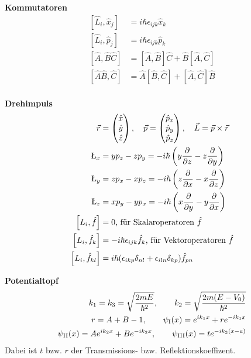 \documentclass[landscape,8pt]{scrartcl}
\newcommand{\myheading}[1]{\noindent\textbf{#1}\\}
\begin{document}
\begin{multicols}{3}
\myheading{Kommutatoren}
\begin{align*}
\left[\hat L_i,\hat x_j\right] &= i\hbar \epsilon_{ijk}\hat x_k	\\
\left[\hat L_i,\hat p_j\right] &= i\hbar \epsilon_{ijk}\hat p_k	\\
\left[\hat A, \hat B \hat C\right]&= \left[ \hat A, \hat B \right] \hat C+ \hat B\left[ \hat A, \hat C \right] \\
\left[\hat A\hat B, \hat C\right]&= \hat A \left[ \hat B, \hat C \right] + \left[ \hat A, \hat C \right] \hat B\\
\end{align*}

\myheading{Drehimpuls}
\begin{align*}
\vec r 	&= \begin{pmatrix}\hat x\\\hat y\\\hat z\end{pmatrix},
\quad \vec p 	= \begin{pmatrix}\hat p_x\\\hat p_y\\\hat p_z\end{pmatrix},
\quad \vec L = \vec p \times \vec r \\
%
\L_x 	&= yp_z - zp_y = -i\hbar \left( y\frac{\partial}{\partial z}-z\frac{\partial}{\partial y}\right) \\
%
\L_y 	&= zp_x - xp_z = -i\hbar \left( z\frac{\partial}{\partial x}-x\frac{\partial}{\partial z}\right) \\
%
\L_z 	&= xp_y - yp_x = -i\hbar \left( x\frac{\partial}{\partial y}-y\frac{\partial}{\partial x}\right)\\
\left[L_i,\hat f\right] &= 0 \text{, für Skalaroperatoren $\hat f$} \\
\left[L_i,\hat f_k\right] &= -i\hbar \epsilon_{ijk}\hat f_k \text{, für Vektoroperatoren $\hat f$} \\
\left[L_i,\hat f_{kl}\right] &= i\hbar (\epsilon_{ikp}\delta_{nl}+\epsilon_{iln}\delta_{kp})\hat f_{pn}
\end{align*}


\myheading{Potentialtopf}
\begin{align*}
k_1 = k_3 = \sqrt{\frac{2mE}{\hbar^2}}, \qquad k_2 = \sqrt{\frac{2m(E-V_0)}{\hbar^2}} \\
r = A+B-1, \qquad \psi_\text I(x) = e^{ik_1x} + re^{-ik_1x} \\
\psi_\text{II}(x) = Ae^{ik_2x} + Be^{-ik_2x}, \qquad \psi_\text{III}(x) = t e^{-ik_3(x-a)}
\end{align*}
Dabei ist $t$ bzw. $r$ der Transmissions- bzw. Reflektionskoeffizent. 


\end{multicols}
\end{document}
